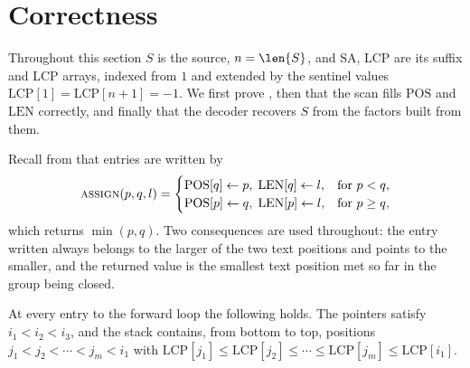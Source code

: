 \section{Correctness}
\label{sec:cps-correctness}

Throughout this section \(S\) is the source, \(n = \len{S}\), and \(\mathrm{SA}\), \(\mathrm{LCP}\) are its suffix and LCP arrays, indexed from \(1\) and extended by the sentinel values \(\mathrm{LCP}[1] = \mathrm{LCP}[n+1] = -1\). We first prove , then that the scan fills \(\mathrm{POS}\) and \(\mathrm{LEN}\) correctly, and finally that the decoder recovers \(S\) from the factors built from them.

Recall from  that entries are written by
\[
    \Call{assign}{p, q, l} =
    \begin{cases}
        \mathrm{POS}[q] \gets p, \; \mathrm{LEN}[q] \gets l, & \text{for } p < q,\\
        \mathrm{POS}[p] \gets q, \; \mathrm{LEN}[p] \gets l, & \text{for } p \geq q,
    \end{cases}
\]
which returns \(\min(p,q)\). Two consequences are used throughout: the entry written always belongs to the larger of the two text positions and points to the smaller, and the returned value is the smallest text position met so far in the group being closed.

\begin{lemma}
\label{lem:cps-stack}
    At every entry to the forward loop the following holds. The pointers satisfy \(i_1 < i_2 < i_3\), and the stack contains, from bottom to top, positions \(j_1 < j_2 < \cdots < j_m < i_1\) with \(\mathrm{LCP}[j_1] \leq \mathrm{LCP}[j_2] \leq \cdots \leq \mathrm{LCP}[j_m] \leq \mathrm{LCP}[i_1]\).
\end{lemma}

